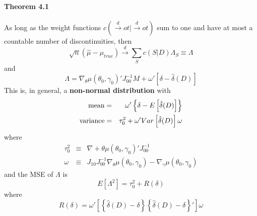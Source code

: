 \paragraph{Theorem 4.1} As long as the weight functions $c(\overset{d}{\rightarrow}ot|\overset{d}{\rightarrow}ot)$ sum to one and have at most a countable number of discontinuities, then
	$$
	\sqrt{n} \left(\hat{\mu} - \mu_{true}  \right) \overset{d}{\rightarrow} \sum_S c(S|D) \Lambda_S \equiv \Lambda
$$
and
	$$
\Lambda = \nabla_\theta \mu(\theta_0,\gamma_0)' J_{00}^{-1} M + \omega' \left[\delta - \hat{\delta}(D) \right] 
$$
This is, in general, a \textbf{non-normal distribution} with
	\begin{eqnarray*}
		\hbox{mean} &=& \omega' \left\{ \delta - E\left[  \hat{\delta}(D) \right] \right\}\\
		\hbox{variance} &=& \tau_0^2 + \omega'Var\left[\hat{\delta}(D)\right]\omega
	\end{eqnarray*}
where
	\begin{eqnarray*}
	\tau_0^2 &\equiv& \nabla+\theta \mu(\theta_0, \gamma_0)' J_{00}^{-1}\\
	\omega &\equiv& J_{10}J_{00}^{-1}\nabla_\theta \mu(\theta_0, \gamma_0) - \nabla_\gamma \mu(\theta_0, \gamma_0)
\end{eqnarray*}
and the MSE of $\Lambda$ is
	$$
	E[\Lambda^2] = \tau_0^2 + R(\delta)
$$
where
	$$R(\delta) = \omega' \left[ \left\{ \hat{\delta}(D) - \delta \right\}  \left\{ \hat{\delta}(D) - \delta \right\}  ' \right]\omega$$

